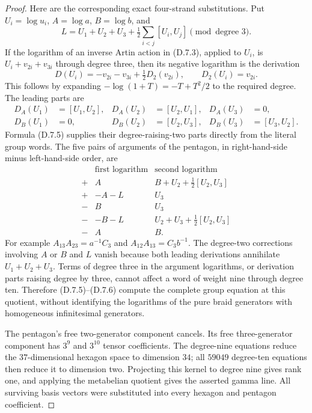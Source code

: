\begin{proof}
Here are the corresponding exact four-strand substitutions.
Put $U_i=\log u_i$, $A=\log a$, $B=\log b$, and
\[
 L=U_1+U_2+U_3+\tfrac12\sum_{i<j}[U_i,U_j]
             \pmod{\text{degree }3}.
\]
If the logarithm of an inverse Artin action in (D.7.3), applied
to $U_i$, is $U_i+v_{2i}+v_{3i}$ through degree three, then
its negative logarithm is the derivation
\[
 D(U_i)=-v_{2i}-v_{3i}
             +\tfrac12D_2(v_{2i}),\qquad D_2(U_i)=v_{2i}.
 \tag{D.7.5}
\]
This follows by expanding $-\log(1+T)=-T+T^2/2$ to the
required degree. The leading parts are
\[
\begin{aligned}
 D_A(U_1)&=[U_1,U_2],&D_A(U_2)&=[U_2,U_1],&D_A(U_3)&=0,\\
 D_B(U_1)&=0,&D_B(U_2)&=[U_2,U_3],&D_B(U_3)&=[U_3,U_2].
\end{aligned}
\]
Formula (D.7.5) supplies their degree-raising-two parts directly
from the literal group words. The five pairs of arguments of the
pentagon, in right-hand-side minus left-hand-side order, are
\[
\begin{array}{c|cc}
 &\text{first logarithm}&\text{second logarithm}\\\hline
 +&A&B+U_2+\tfrac12[U_2,U_3]\\
 +&-A-L&U_3\\
 -&B&U_3\\
 -&-B-L&U_2+U_3+\tfrac12[U_2,U_3]\\
 -&A&B.
\end{array}
\tag{D.7.6}
\]
For example $A_{13}A_{23}=a^{-1}C_3$ and
$A_{12}A_{13}=C_3b^{-1}$. The degree-two corrections involving
$A$ or $B$ and $L$ vanish because both leading derivations
annihilate $U_1+U_2+U_3$. Terms of degree three in the argument
logarithms, or derivation parts raising degree by three, cannot
affect a word of weight nine through degree ten. Therefore
(D.7.5)--(D.7.6) compute the complete group equation at this
quotient, without identifying the logarithms of the pure braid
generators with homogeneous infinitesimal generators.

The pentagon's free two-generator component cancels. Its free
three-generator component has $3^9$ and $3^{10}$ tensor
coefficients. The degree-nine equations reduce the $37$-dimensional
hexagon space to dimension $34$; all $59049$ degree-ten equations
then reduce it to dimension two. Projecting this kernel to degree
nine gives rank one, and applying the metabelian quotient gives
the asserted gamma line. All surviving basis vectors were
substituted into every hexagon and pentagon coefficient.


\end{proof}
